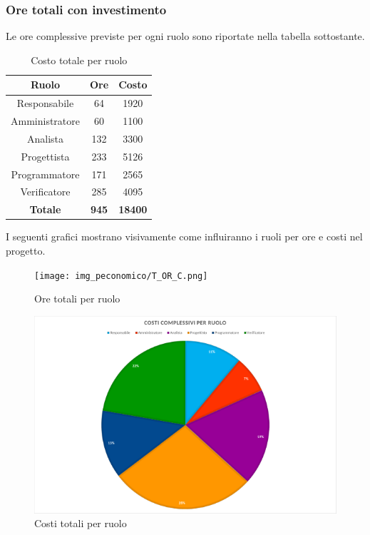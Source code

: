 \subsubsection{Ore totali con investimento}
Le ore complessive previste per ogni ruolo sono riportate nella tabella sottostante.
\begin{table}[H]
	\centering
	\begin{tabular}{|c|c|c|}
		\hline
		\textbf{Ruolo} &
		\textbf{Ore} &
		\textbf{Costo} \\
		\hline
		Responsabile & 64 & 1920\\
		\hline
		Amministratore & 60 & 1100\\
		\hline
		Analista & 132 & 3300\\
		\hline
		Progettista & 233 & 5126 \\
		\hline
		Programmatore & 171 & 2565 \\
		\hline
		Verificatore & 285 & 4095\\
		\hline
		\textbf{Totale} & \textbf{945} & \textbf{18400} \\
		\hline
	\end{tabular}
	\caption{Costo totale per ruolo}
\end{table}
I seguenti grafici mostrano visivamente come influiranno i ruoli per ore e costi nel progetto.
\begin{figure}[H]
	\centering
	\texttt{[image: img\_peconomico/T\_OR\_C.png]}
	\caption{Ore totali per ruolo}
\end{figure}
\begin{figure}[H]
	\centering
	\includegraphics[width=14cm]{img_peconomico/T_CR_C.png}
	\caption{Costi totali per ruolo}
\end{figure}

